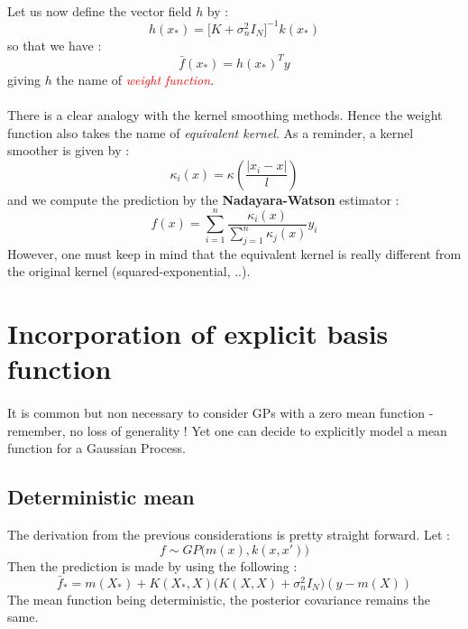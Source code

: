 \documentclass[a4paper]{article}
\begin{document}
{{			\paragraph{} Let us now define the vector field $h$ by : 
			\begin{equation}
				h(x_*) = \Big[K+\sigma_n^2I_N\Big]^{-1}k(x_*)
			\end{equation}
			so that we have : 
			\begin{equation}
				\bar{f}(x_*) = h(x_*)^Ty
			\end{equation}
			giving $h$ the name of \textcolor{red}{\emph{weight function}}.
			
			\paragraph{} There is a clear analogy with the kernel smoothing methods. Hence the weight function also takes the name of \emph{equivalent kernel}. As a reminder, a kernel smoother is given by : 
			\begin{equation}
				\kappa_i(x) = \kappa\left(\frac{\vert x_i - x \vert}{l}\right)
			\end{equation}
			and we compute the prediction by the \textbf{Nadayara-Watson} estimator : 
			\begin{equation}
				f(x) = \sum_{i=1}^n \frac{\kappa_i(x)}{\sum_{j=1}^n \kappa_j(x) }y_i
			\end{equation}
			However, one must keep in mind that the equivalent kernel is really different from the original kernel (squared-exponential, ..). 
		}
		
		\section{Incorporation of explicit basis function}
		{
			\paragraph{} It is common but non necessary to consider GPs with a zero mean function - remember, no loss of generality ! Yet one can decide to explicitly model a mean function for a Gaussian Process. 
			
			\subsection{Deterministic mean}
			{
				The derivation from the previous considerations is pretty straight forward. Let : 
				\begin{equation}
					f \sim GP\Big( m(x), k(x,x') \big)
				\end{equation}
				Then the prediction is made by using the following : 
				\begin{equation}
					\bar{f}_* = m(X_*) + K(X_*,X)\Big(K(X,X)+\sigma_n^2I_N\Big)(y-m(X))
				\end{equation}
				The mean function being deterministic, the posterior covariance remains the same. 
			}
}}
\end{document}
